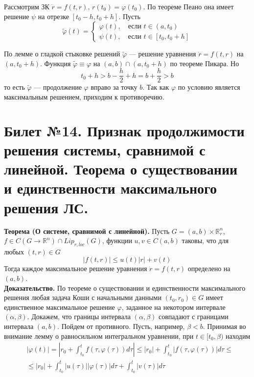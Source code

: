 \documentclass{article}
\begin{document}
Рассмотрим ЗК $\dot{r} = f(t,r),\, r(t_0) = \varphi(t_0)$. По теореме Пеано она имеет решение $\psi$ на отрезке $[t_0 - h, t_0 + h]$. Пусть
\begin{equation*}
    \widetilde{\varphi}(t) = \begin{cases}
    \varphi(t), \quad \text{если } t \in (a, t_0)\\
    \psi(t), \quad \text{если } t \in [t_0, t_0 + h]
    \end{cases}
\end{equation*}

По лемме о гладкой стыковке решений $\widetilde{\varphi}$ --- решение уравнения $\dot{r} = f(t,r)$ на $(a, t_0 + h)$. Функция $\widetilde{\varphi} \equiv \varphi$ на $(a,b) \cap (a, t_0 + h)$ по теореме Пикара. Но
\begin{equation*}
    t_0 + h > b - \frac{h}{2} + h = b + \frac{h}{2} > b
\end{equation*}
то есть $\widetilde{\varphi}$ --- продолжение $\varphi$ вправо за точку $b$. Так как $\varphi$ по условию является максимальным решением, приходим к противоречию.

\section{Билет №14. Признак продолжимости решения системы, сравнимой с линейной. Теорема о существовании и единственности максимального решения ЛС.}
\textbf{Теорема (О системе, сравнимой с линейной).} Пусть $G = (a,b) \times \mathbb{R}_r^n$, $f \in C(G \to \mathbb{R}^n) \cap Lip_{r,loc}(G)$, функции $u,v \in C(a,b)$ таковы, что для любых $(t,r) \in G$
\begin{equation*}
    |f(t,r)| \le u(t)|r| + v(t)
\end{equation*}
Тогда каждое максимальное решение уравнения $\dot{r} = f(t,r)$ определено на $(a,b)$.\\

\noindent \textbf{Доказательство.} По теореме о существовании и единственности максимального решения любая задача Коши с начальными данными $(t_0, r_0) \in G$ имеет единственное максимальное решение $\varphi$, заданное на некотором интервале $(\alpha, \beta)$. Докажем, что границы интервала $(\alpha, \beta)$ совпадают с границами интервала $(a,b)$. Пойдем от противного. Пусть, например, $\beta < b$. Принимая во внимание лемму о равносильном интегральном уравнении, при $t \in [t_0, \beta)$ находим
\begin{equation*}
    \begin{aligned}
        &|\varphi(t)| = \left|r_0 + \int_{t_0}^t f(\tau, \varphi(\tau))d\tau \right| \le |r_0| + \int_{t_0}^t |f(\tau, \varphi(\tau))|d\tau \le\\
        &\le |r_0| + \int_{t_0}^t |u(\tau)||\varphi(\tau)|d\tau + \int_{t_0}^t |v(\tau)|d\tau
    \end{aligned}
\end{equation*}
\end{document}
